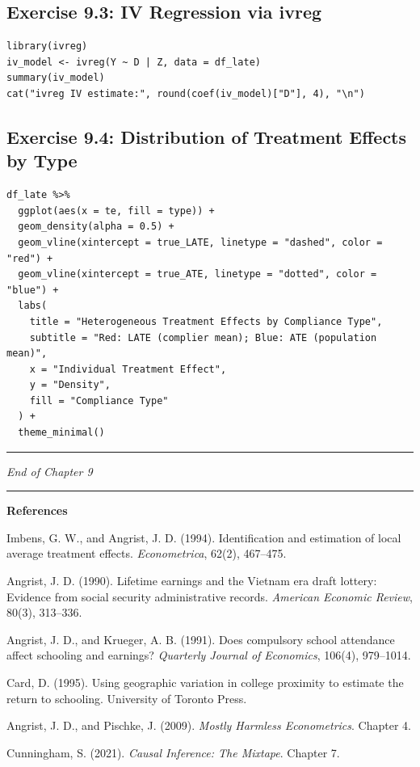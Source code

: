 \subsection{Exercise 9.3: IV Regression via ivreg}

\begin{lstlisting}
library(ivreg)
iv_model <- ivreg(Y ~ D | Z, data = df_late)
summary(iv_model)
cat("ivreg IV estimate:", round(coef(iv_model)["D"], 4), "\n")
\end{lstlisting}

\subsection{Exercise 9.4: Distribution of Treatment Effects by Type}

\begin{lstlisting}
df_late %>%
  ggplot(aes(x = te, fill = type)) +
  geom_density(alpha = 0.5) +
  geom_vline(xintercept = true_LATE, linetype = "dashed", color = "red") +
  geom_vline(xintercept = true_ATE, linetype = "dotted", color = "blue") +
  labs(
    title = "Heterogeneous Treatment Effects by Compliance Type",
    subtitle = "Red: LATE (complier mean); Blue: ATE (population mean)",
    x = "Individual Treatment Effect",
    y = "Density",
    fill = "Compliance Type"
  ) +
  theme_minimal()
\end{lstlisting}

\medskip\hrule\medskip

\textit{End of Chapter 9}

\medskip\hrule\medskip

\textbf{References}

Imbens, G. W., and Angrist, J. D. (1994). Identification and estimation of local average treatment effects. \textit{Econometrica}, 62(2), 467--475.

Angrist, J. D. (1990). Lifetime earnings and the Vietnam era draft lottery: Evidence from social security administrative records. \textit{American Economic Review}, 80(3), 313--336.

Angrist, J. D., and Krueger, A. B. (1991). Does compulsory school attendance affect schooling and earnings? \textit{Quarterly Journal of Economics}, 106(4), 979--1014.

Card, D. (1995). Using geographic variation in college proximity to estimate the return to schooling. University of Toronto Press.

Angrist, J. D., and Pischke, J. (2009). \textit{Mostly Harmless Econometrics}. Chapter 4.

Cunningham, S. (2021). \textit{Causal Inference: The Mixtape}. Chapter 7.
